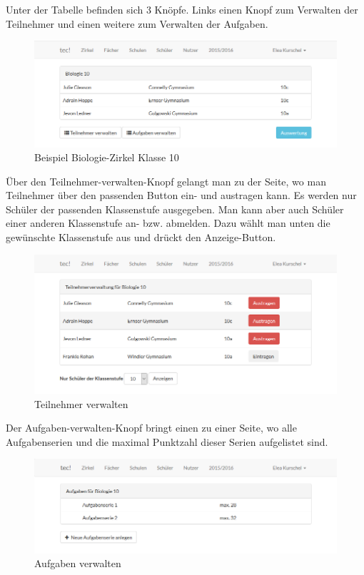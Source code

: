 Unter der Tabelle befinden sich 3 Knöpfe. Links einen Knopf zum Verwalten der Teilnehmer und einen weitere zum Verwalten der Aufgaben. 

\begin{figure}[ht]
	\centering
	\includegraphics[scale=.5]{bilder/Zirkel_Biologie.png}
	\caption{Beispiel Biologie-Zirkel Klasse 10}
	\label{abb:beispiel}
\end{figure}

Über den Teilnehmer-verwalten-Knopf gelangt man zu der Seite, wo man Teilnehmer über den passenden Button ein- und austragen kann. Es werden nur Schüler der passenden Klassenstufe ausgegeben. Man kann aber auch Schüler einer anderen Klassenstufe an- bzw. abmelden. Dazu wählt man unten die gewünschte Klassenstufe aus und drückt den Anzeige-Button. 

\begin{figure}[ht]
	\centering
	\includegraphics[scale=.5]{bilder/Teilnehmer_verwalten.png}
	\caption{Teilnehmer verwalten}
\end{figure}

Der Aufgaben-verwalten-Knopf bringt einen zu einer Seite, wo alle Aufgabenserien und die maximal Punktzahl dieser Serien aufgelistet sind. 

\begin{figure}[ht]
	\centering
	\includegraphics[scale=.5]{bilder/Aufgaben_verwalten.png}
	\caption{Aufgaben verwalten}
\end{figure}

